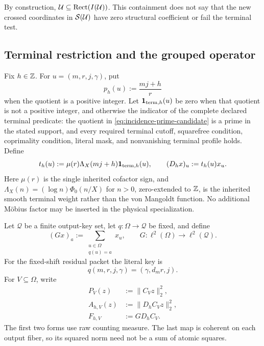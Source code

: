 By construction, \(\mathcal U\subseteq\operatorname{Rect}(I(\mathcal U))\).  This containment does not
say that the new crossed coordinates in \(\mathcal S(\mathcal U)\) have zero structural
coefficient or fail the terminal test.

\subsection{Terminal restriction and the grouped operator}

Fix \(h\in\mathbb Z\).  For \(u=(m,r,j,\gamma)\), put
\begin{equation}
 p_h(u):=\frac{mj+h}{r}
 \label{eq:incidence-prime-candidate}
\end{equation}
when the quotient is a positive integer.  Let
\(\mathbf 1_{\mathrm{term},h}(u)\) be zero when that quotient is not a positive
integer, and otherwise the indicator of the complete declared terminal
predicate: the quotient in \eqref{eq:incidence-prime-candidate} is a prime
in the stated support, and every required terminal cutoff,
squarefree condition, coprimality condition, literal mask, and nonvanishing
terminal profile holds.  Define
\begin{equation}
 t_h(u):=\mu(r)\Lambda_X(mj+h)\mathbf 1_{\mathrm{term},h}(u),
 \qquad
 (D_hx)_u:=t_h(u)x_u.
 \label{eq:incidence-terminal-diagonal}
\end{equation}
Here \(\mu(r)\) is the single inherited cofactor sign, and
\(\Lambda_X(n)=(\log n)\Phi_0(n/X)\) for \(n>0\), zero-extended to
\(\mathbb Z\), is the inherited smooth terminal weight rather than the von
Mangoldt function.  No additional M\"obius factor may be inserted in the
physical specialization.

Let \(\mathcal Q\) be a finite output-key set, let
\(q:\Omega\to\mathcal Q\) be fixed, and define
\begin{equation}
 (Gx)_a:=\sum_{\substack{u\in\Omega\\q(u)=a}}x_u,
 \qquad
 G:\ell^2(\Omega)\longrightarrow\ell^2(\mathcal Q).
 \label{eq:incidence-grouping-map}
\end{equation}
For the fixed-shift residual packet the literal key is
\begin{equation}
 q(m,r,j,\gamma)=(\gamma,d_mr,j).
 \label{eq:incidence-physical-key}
\end{equation}
For \(V\subseteq\Omega\), write
\begin{align}
 P_V(z)&:=\|C_Vz\|_2^2,
 \label{eq:incidence-preterminal-form}\\
 A_{h,V}(z)&:=\|D_hC_Vz\|_2^2,
 \label{eq:incidence-terminal-atomic-form}\\
 F_{h,V}&:=GD_hC_V.
 \label{eq:incidence-grouped-operator}
\end{align}
The first two forms use raw counting measure.  The last map is coherent on
each output fiber, so its squared norm need not be a sum of atomic squares.

